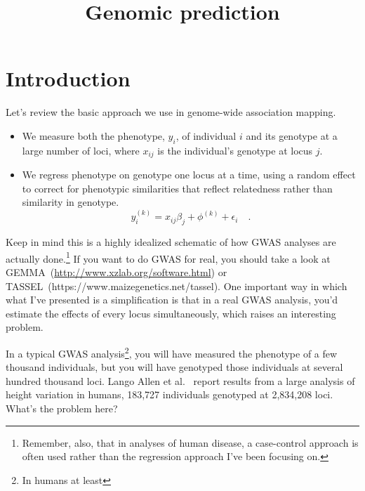 \documentclass[12pt]{article}
\title{Genomic prediction}
\begin{document}
\maketitle

\thispagestyle{first}

\section*{Introduction}

Let's review the basic approach we use in genome-wide association
mapping.

\begin{itemize}

\item We measure both the phenotype, $y_i$, of individual $i$ and its
  genotype at a large number of loci, where $x_{ij}$ is the
  individual's genotype at locus $j$.

\item We regress phenotype on genotype one locus at a time, using a
  random effect to correct for phenotypic similarities that reflect
  relatedness rather than similarity in genotype. 
\[
y_i^{(k)} = x_{ij}\beta_j + \phi^{(k)} + \epsilon_i \quad .
\]

\end{itemize}

Keep in mind this is a highly idealized schematic of how GWAS analyses
are actually done.\footnote{Remember, also, that in analyses of human
  disease, a case-control approach is often used rather than the
  regression approach I've been focusing on.} If you want to do GWAS
for real, you should take a look at
GEMMA~(\url{http://www.xzlab.org/software.html}) or
TASSEL~(https://www.maizegenetics.net/tassel). One
important way in which what I've presented is a simplification is that
in a real GWAS analysis, you'd estimate the effects of every locus
simultaneously, which raises an interesting problem.

In a typical GWAS analysis\footnote{In humans at least}, you will have
measured the phenotype of a few thousand individuals, but you will
have genotyped those individuals at several hundred thousand
loci. Lango Allen et al.~\cite{LangoAllen-etal-2010} report results
from a large analysis of height variation in humans, 183,727
individuals genotyped at 2,834,208 loci. What's the problem here?
\end{document}
